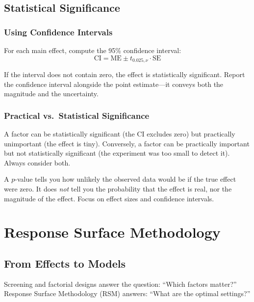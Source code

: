 \documentclass[11pt]{book}
\begin{document}
\section{Statistical Significance}

\subsection{Using Confidence Intervals}

For each main effect, compute the 95\% confidence interval:
\[
\text{CI} = \text{ME} \pm t_{0.025, \nu} \cdot \text{SE}
\]

If the interval does not contain zero, the effect is statistically significant.
Report the confidence interval alongside the point estimate---it conveys both
the magnitude and the uncertainty.

\subsection{Practical vs.\ Statistical Significance}

A factor can be statistically significant (the CI excludes zero) but practically
unimportant (the effect is tiny). Conversely, a factor can be practically
important but not statistically significant (the experiment was too small to
detect it). Always consider both.

\begin{warning}
A $p$-value tells you how unlikely the observed data would be if the true effect
were zero. It does \emph{not} tell you the probability that the effect is real,
nor the magnitude of the effect. Focus on effect sizes and confidence intervals.
\end{warning}


\chapter{Response Surface Methodology}

\section{From Effects to Models}

Screening and factorial designs answer the question: ``Which factors matter?''
Response Surface Methodology (RSM) answers: ``What are the optimal settings?''
\end{document}
